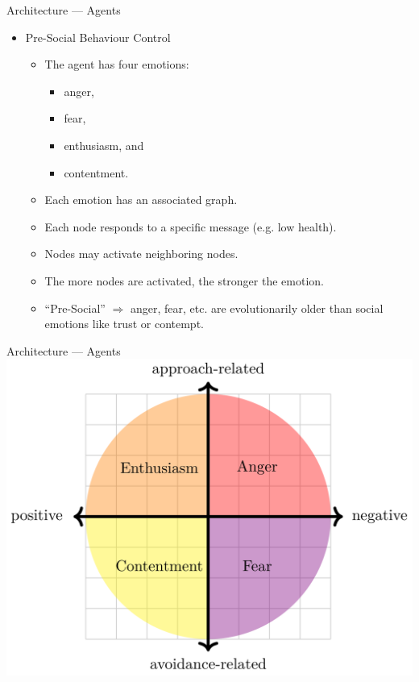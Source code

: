 \documentclass{beamer}
\def\tikzoverlay{%
   \tikz[baseline,overlay]\node[every overlay node]
}%
\begin{document}
   \begin{frame}{Architecture --- Agents}
      \begin{itemize}   
         \item Pre-Social Behaviour Control
         \pause
            \begin{itemize}
               \item The agent has four emotions:
                  \begin{itemize}
                     \item anger,
                     \item fear,
                     \item enthusiasm, and
                     \item contentment.   
                  \end{itemize}
               \pause
               \item Each emotion has an associated graph.
               \pause
               \item Each node responds to a specific message (e.g. low health).
               \pause
               \item Nodes may activate neighboring nodes.
               \pause
               \item The more nodes are activated, the stronger the emotion.
               \pause
               \vspace{3mm}
               \item ``Pre-Social'' $\Rightarrow$ anger, fear, etc. are evolutionarily older than social emotions like trust or contempt.
            \end{itemize}
      \end{itemize}
      
   \end{frame}
   
   \begin{frame}{Architecture --- Agents}
      \includegraphics[width=\textwidth]{../Thesis/Figs/PSBC.png}
   \end{frame}
   
\end{document}
